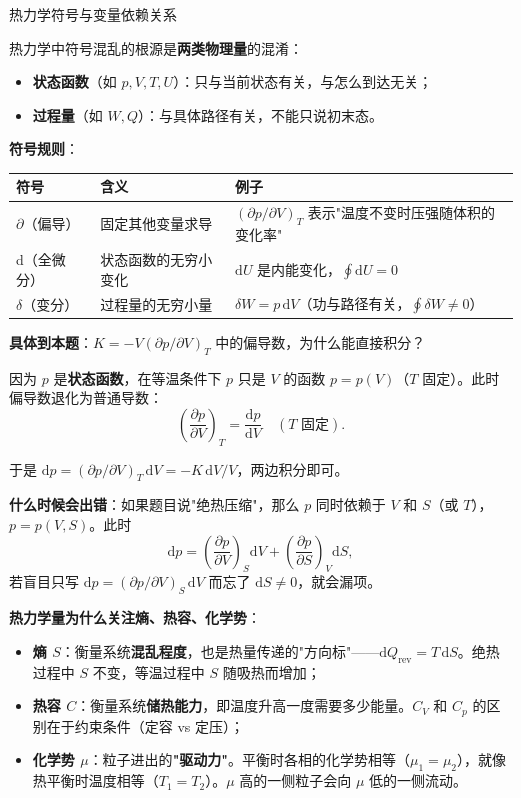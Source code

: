 \begin{insightbox}{热力学符号与变量依赖关系}

热力学中符号混乱的根源是\textbf{两类物理量}的混淆：
\begin{itemize}[nosep]
  \item \textbf{状态函数}（如 $p,V,T,U$）：只与当前状态有关，与怎么到达无关；
  \item \textbf{过程量}（如 $W,Q$）：与具体路径有关，不能只说初末态。
\end{itemize}

\textbf{符号规则}：
\begin{center}
\renewcommand{\arraystretch}{1.4}
\begin{tabular}{|l|l|l|}
\hline
\textbf{符号} & \textbf{含义} & \textbf{例子} \\
\hline
$\partial$（偏导） & 固定其他变量求导 & $(\partial p/\partial V)_T$ 表示"温度不变时压强随体积的变化率" \\
\hline
\mbox{\textup{d}}（全微分） & 状态函数的无穷小变化 & $\mathrm{d}U$ 是内能变化，$\oint\mathrm{d}U = 0$ \\
\hline
$\delta$（变分） & 过程量的无穷小量 & $\delta W = p\,\mathrm{d}V$（功与路径有关，$\oint\delta W \neq 0$） \\
\hline
\end{tabular}
\end{center}

\vspace{0.5em}
\textbf{具体到本题}：$K = -V(\partial p/\partial V)_T$ 中的偏导数，为什么能直接积分？

因为 $p$ 是\textbf{状态函数}，在等温条件下 $p$ 只是 $V$ 的函数 $p = p(V)$（$T$ 固定）。此时偏导数退化为普通导数：
\[
  \left(\frac{\partial p}{\partial V}\right)_T = \frac{\mathrm{d}p}{\mathrm{d}V} \quad (T\text{ 固定}) .
\]

于是 $\mathrm{d}p = (\partial p/\partial V)_T\,\mathrm{d}V = -K\,\mathrm{d}V/V$，两边积分即可。

\textbf{什么时候会出错}：如果题目说"绝热压缩"，那么 $p$ 同时依赖于 $V$ 和 $S$（或 $T$），$p = p(V,S)$。此时
\[
  \mathrm{d}p = \left(\frac{\partial p}{\partial V}\right)_S\mathrm{d}V + \left(\frac{\partial p}{\partial S}\right)_V\mathrm{d}S ,
\]
若盲目只写 $\mathrm{d}p = (\partial p/\partial V)_S\,\mathrm{d}V$ 而忘了 $\mathrm{d}S \neq 0$，就会漏项。

\vspace{0.5em}
\textbf{热力学量为什么关注熵、热容、化学势}：

\begin{itemize}[nosep]
  \item \textbf{熵 $S$}：衡量系统\textbf{混乱程度}，也是热量传递的"方向标"——$\mathrm{d}Q_{\text{rev}} = T\,\mathrm{d}S$。绝热过程中 $S$ 不变，等温过程中 $S$ 随吸热而增加；
  \item \textbf{热容 $C$}：衡量系统\textbf{储热能力}，即温度升高一度需要多少能量。$C_V$ 和 $C_p$ 的区别在于约束条件（定容 vs 定压）；
  \item \textbf{化学势 $\mu$}：粒子进出的\textbf{"驱动力"}。平衡时各相的化学势相等（$\mu_1 = \mu_2$），就像热平衡时温度相等（$T_1 = T_2$）。$\mu$ 高的一侧粒子会向 $\mu$ 低的一侧流动。
\end{itemize}


\end{insightbox}
